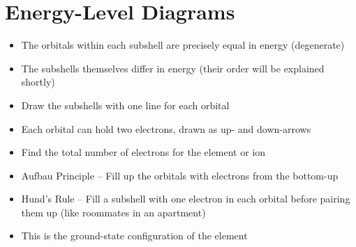 \documentclass[12pt, openany, letterpaper]{memoir}
\begin{document}
\section{Energy-Level Diagrams}
\begin{itemize}
	\item The orbitals within each subshell are precisely equal in energy (degenerate)
	\item The subshells themselves differ in energy (their order will be explained shortly)
	\item Draw the subshells with one line for each orbital
	\item Each orbital can hold two electrons, drawn as up- and down-arrows
	\item Find the total number of electrons for the element or ion
	\item Aufbau Principle -- Fill up the orbitals with electrons from the bottom-up
	\item Hund's Rule -- Fill a subshell with one electron in each orbital before pairing them up (like roommates in an apartment)
	\item This is the ground-state configuration of the element
\end{itemize}
\end{document}
